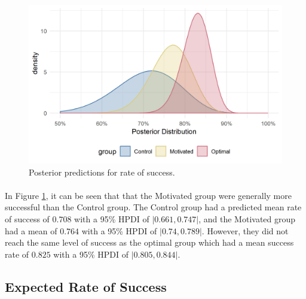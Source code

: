 \documentclass[12pt]{article}
\begin{document}
\begin{figure}[ht!]
	\includegraphics[scale=1]{../Figures/Model_stan_rawacc.png}
	\centering
	\captionsetup{justification=centering}
	\caption{Posterior predictions for rate of success.}
	\label{fig:Model_raw_acc}
\end{figure}

\paragraph{} In Figure \ref{fig:Model_raw_acc}, it can be seen that that the Motivated group were generally more successful than the Control group. The Control group had a predicted mean rate of success of $0.708$ with a 95\% HPDI of $|0.661, 0.747|$, and the Motivated group had a mean of $0.764$ with a 95\% HPDI of $|0.74, 0.789|$. However, they did not reach the same level of success as the optimal group which had a mean success rate of $0.825$ with a 95\% HPDI of $|0.805, 0.844|$. 


\subsection*{Expected Rate of Success}
\end{document}

